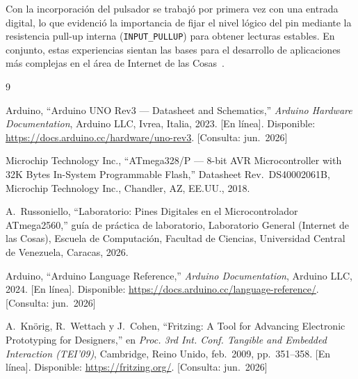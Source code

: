 \documentclass[11pt,a4paper]{article}
\begin{document}
                                                                                                           Con la incorporaci\'on del pulsador se trabaj\'o por primera vez con una entrada digital,
                                                                                                           lo que evidenci\'o la importancia de fijar el nivel l\'ogico del pin mediante la resistencia
                                                                                                           pull-up interna (\texttt{INPUT\_PULLUP}) para obtener lecturas estables. En conjunto,
                                                                                                           estas experiencias sientan las bases para el desarrollo de aplicaciones m\'as complejas
                                                                                                           en el \'area de Internet de las Cosas~\cite{guialab,arduinoref}.

                                                                                                           \newpage
                                                                                                           \begingroup
\small
\begin{thebibliography}{9}

Arduino, ``Arduino UNO Rev3 --- Datasheet and Schematics,''
\emph{Arduino Hardware Documentation}, Arduino LLC, Ivrea, Italia, 2023.
[En línea]. Disponible: \url{https://docs.arduino.cc/hardware/uno-rev3}.
[Consulta: jun.~2026]

Microchip Technology Inc., ``ATmega328/P --- 8-bit AVR Microcontroller with
32K Bytes In-System Programmable Flash,'' Datasheet Rev.~DS40002061B,
Microchip Technology Inc., Chandler, AZ, EE.UU., 2018.

A.~Russoniello, ``Laboratorio: Pines Digitales en el Microcontrolador
ATmega2560,'' guía de práctica de laboratorio, Laboratorio General
(Internet de las Cosas), Escuela de Computación, Facultad de Ciencias,
Universidad Central de Venezuela, Caracas, 2026.

Arduino, ``Arduino Language Reference,'' \emph{Arduino Documentation},
Arduino LLC, 2024. [En línea]. Disponible:
\url{https://docs.arduino.cc/language-reference/}. [Consulta: jun.~2026]

A.~Knörig, R.~Wettach y J.~Cohen, ``Fritzing: A Tool for Advancing
Electronic Prototyping for Designers,'' en \emph{Proc. 3rd Int. Conf.
Tangible and Embedded Interaction (TEI'09)}, Cambridge, Reino Unido,
feb.~2009, pp.~351--358. [En línea]. Disponible: \url{https://fritzing.org/}.
[Consulta: jun.~2026]

\end{thebibliography}
\endgroup

                                                                                                           
\end{document}
